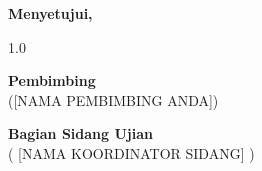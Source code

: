 \vspace{1.5cm}

\begin{center}
	\textbf{Menyetujui,}
\end{center}

\vspace{0.5cm}

\begin{spacing}{1.0}
	\begin{center}
		\begin{minipage}[t]{0.45\textwidth}
			\centering
			\textbf{Pembimbing} \\[2.5cm]
			([NAMA PEMBIMBING ANDA])
		\end{minipage}
		\hfill
		\begin{minipage}[t]{0.45\textwidth}
			\centering
			\textbf{Bagian Sidang Ujian} \\[2.5cm]
			( [NAMA KOORDINATOR SIDANG] )
		\end{minipage}
	\end{center}
\end{spacing}
